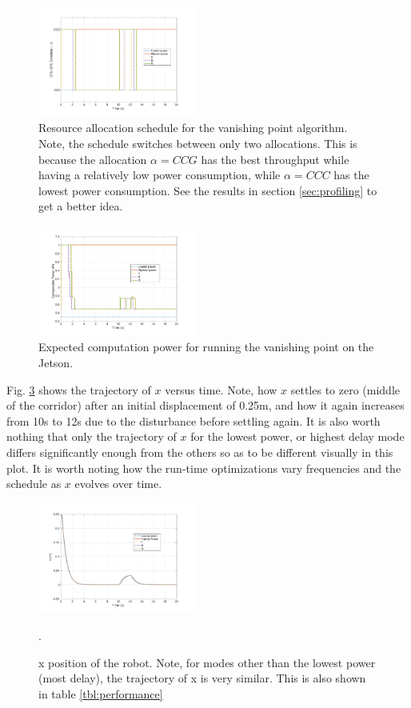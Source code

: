 \begin{figure}[hbtp]
\centering
\includegraphics[width=0.46\textwidth]{../simulations/figs/schedule.pdf}
\caption{Resource allocation schedule for the vanishing point algorithm. Note, the schedule switches between only two allocations. This is because the allocation $\alpha=CCG$ has the best throughput while having a relatively low power consumption, while $\alpha=CCC$ has the lowest power consumption. See the results in section \ref{sec:profiling} to get a better idea.}
\label{fig:schedule} 
\end{figure}

\begin{figure}[hbtp]
\centering
\includegraphics[width=0.46\textwidth]{../simulations/figs/power.pdf}
\caption{Expected computation power for running the vanishing point on the Jetson.}
\label{fig:power} 
\end{figure}

Fig. \ref{fig:xvst} shows the trajectory of $x$ versus time. Note, how $x$ settles to zero (middle of the corridor) after an initial displacement of 0.25m, and how it again increases from 10s to 12s due to the disturbance before settling again. It is also worth nothing that only the trajectory of $x$ for the lowest power, or highest delay mode differs significantly enough from the others so as to be different visually in this plot. It is worth noting how the run-time optimizations vary frequencies and the schedule as $x$ evolves over time.


\begin{figure}[hbtp]
\centering
\includegraphics[width=0.46\textwidth]{../simulations/figs/xvst.pdf}
\caption{x position of the robot. Note, for modes other than the lowest power (most delay), the trajectory of x is very similar. This is also shown in table \ref{tbl:performance}}.
\label{fig:xvst} 
\end{figure}


